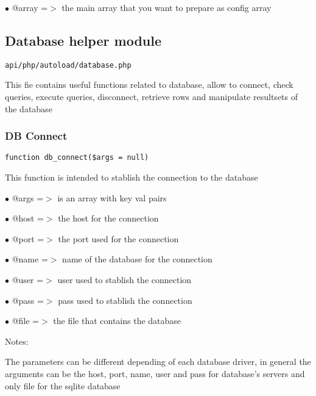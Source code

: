 \documentclass[a4paper]{article}
\begin{document}
\begin{compactitem}
\item[\color{myblue}$\bullet$] @array =$>$ the main array that you want to prepare as config array
\end{compactitem}

\hypertarget{toc84}{}
\subsection{Database helper module}

\begin{lstlisting}
api/php/autoload/database.php
\end{lstlisting}

This fie contains useful functions related to database, allow to connect, check queries, execute
queries, disconnect, retrieve rows and manipulate resultsets of the database

\hypertarget{toc85}{}
\subsubsection{DB Connect}

\begin{lstlisting}
function db_connect($args = null)
\end{lstlisting}

This function is intended to stablish the connection to the database

\begin{compactitem}
\item[\color{myblue}$\bullet$] @args =$>$ is an array with key val pairs
\item[\color{myblue}$\bullet$] @host =$>$ the host for the connection
\item[\color{myblue}$\bullet$] @port =$>$ the port used for the connection
\item[\color{myblue}$\bullet$] @name =$>$ name of the database for the connection
\item[\color{myblue}$\bullet$] @user =$>$ user used to stablish the connection
\item[\color{myblue}$\bullet$] @pass =$>$ pass used to stablish the connection
\item[\color{myblue}$\bullet$] @file =$>$ the file that contains the database
\end{compactitem}

Notes:

The parameters can be different depending of each database driver, in general the arguments can
be the host, port, name, user and pass for database's servers and only file for the sqlite database
\end{document}
